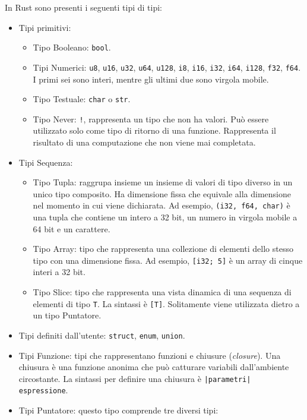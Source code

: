In Rust sono presenti i seguenti tipi di tipi:
\begin{itemize}
    \item Tipi primitivi:
        \begin{itemize}
            \item Tipo Booleano: \texttt{bool}.
            \item Tipi Numerici: \texttt{u8}, \texttt{u16}, \texttt{u32}, \texttt{u64}, \texttt{u128}, \texttt{i8}, \texttt{i16}, \texttt{i32}, \texttt{i64}, \texttt{i128}, \texttt{f32}, \texttt{f64}. I primi sei sono interi, mentre gli ultimi due sono virgola mobile.
            \item Tipo Testuale: \texttt{char} o \texttt{str}. 
            \item Tipo Never: \texttt{!}, rappresenta un tipo che non ha valori. Può essere utilizzato solo come tipo di ritorno di una funzione. Rappresenta il risultato di una computazione che non viene mai completata. 
        \end{itemize} 
    \item Tipi Sequenza: 
        \begin{itemize}
            \item Tipo Tupla: raggrupa insieme un insieme di valori di tipo diverso in un unico tipo composito. Ha dimensione fissa che equivale alla dimensione nel momento in cui viene dichiarata. Ad esempio, \texttt{(i32, f64, char)} è una tupla che contiene un intero a 32 bit, un numero in virgola mobile a 64 bit e un carattere.
            \item Tipo Array: tipo che rappresenta una collezione di elementi dello stesso tipo con una dimensione fissa. Ad esempio, \texttt{[i32; 5]} è un array di cinque interi a 32 bit.
            \item Tipo Slice: tipo che rappresenta una vista dinamica di una sequenza di elementi di tipo \texttt{T}. La sintassi è \texttt{[T]}. Solitamente viene utilizzata dietro a un tipo Puntatore.
        \end{itemize}
        \item Tipi definiti dall'utente: \texttt{struct}, \texttt{enum}, \texttt{union}.
        \item Tipi Funzione: tipi che rappresentano funzioni e chiusure (\textit{closure}). Una chiusura è una funzione anonima che può catturare variabili dall'ambiente circostante. La sintassi per definire una chiusura è \texttt{|parametri| espressione}.
        \item Tipi Puntatore: questo tipo comprende tre diversi tipi:

\end{itemize}
